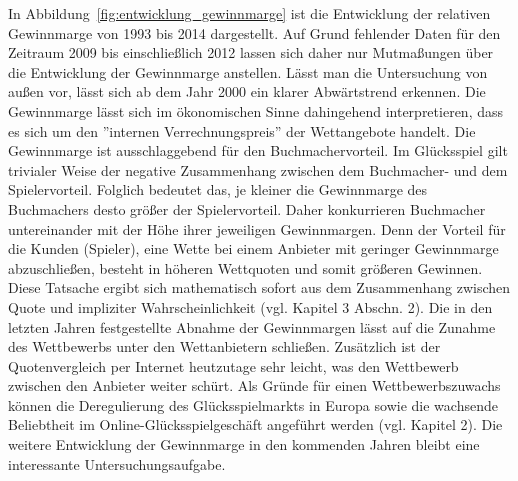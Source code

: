 In Abbildung~\ref{fig:entwicklung_gewinnmarge} ist die Entwicklung der relativen Gewinnmarge von 1993 bis 2014 dargestellt. Auf Grund fehlender Daten für den Zeitraum 2009 bis einschließlich 2012 lassen sich daher nur Mutmaßungen über die Entwicklung der Gewinnmarge anstellen. Lässt man die Untersuchung von \citet{kuypers2000information} außen vor, lässt sich ab dem Jahr 2000 ein klarer Abwärtstrend erkennen. Die Gewinnmarge lässt sich im ökonomischen Sinne dahingehend interpretieren, dass es sich um den ''internen Verrechnungspreis'' der Wettangebote handelt. Die Gewinnmarge ist ausschlaggebend für den Buchmachervorteil. Im Glücksspiel gilt trivialer Weise der negative Zusammenhang zwischen dem Buchmacher-  und dem Spielervorteil. Folglich bedeutet das, je kleiner die Gewinnmarge des Buchmachers desto größer der Spielervorteil. Daher konkurrieren Buchmacher untereinander mit der Höhe ihrer jeweiligen Gewinnmargen. Denn der Vorteil für die Kunden (Spieler), eine Wette bei einem Anbieter mit geringer Gewinnmarge abzuschließen, besteht in höheren Wettquoten und somit größeren Gewinnen. Diese Tatsache ergibt sich mathematisch sofort aus dem Zusammenhang zwischen Quote und impliziter Wahrscheinlichkeit (vgl. Kapitel 3 Abschn. 2). Die in den letzten Jahren festgestellte Abnahme der Gewinnmargen lässt auf die Zunahme des Wettbewerbs unter den Wettanbietern schließen. Zusätzlich ist der Quotenvergleich per Internet heutzutage sehr leicht, was den Wettbewerb zwischen den Anbieter weiter schürt. Als Gründe für einen Wettbewerbszuwachs können die Deregulierung des Glücksspielmarkts in Europa sowie die wachsende Beliebtheit im Online-Glücksspielgeschäft angeführt werden (vgl. Kapitel 2). Die weitere Entwicklung der Gewinnmarge in den kommenden Jahren bleibt eine interessante Untersuchungsaufgabe.


